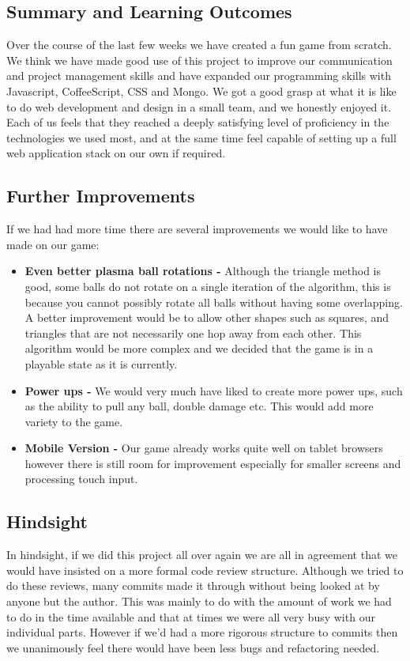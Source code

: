 \documentclass[a4wide, 11pt]{article}
\begin{document}
\subsection{Summary and Learning Outcomes}
Over the course of the last few weeks we have created a fun game from scratch.
We think we have made good use of this project to improve our communication and project management skills and have expanded our programming skills with Javascript, CoffeeScript, CSS and Mongo.
We got a good grasp at what it is like to do web development and design in a small team, and we honestly enjoyed it. Each of us feels that they reached a deeply satisfying level of proficiency in the technologies we used most, and at the same time feel capable of setting up a full web application stack on our own if required.

\subsection{Further Improvements}
If we had had more time there are several improvements we would like to have made on our game:
\begin{itemize}
    \item\textbf{Even better plasma ball rotations -} Although the triangle method is good, some balls do not rotate on a single iteration of the algorithm, this is because you cannot possibly rotate all balls without having some overlapping. A better improvement would be to allow other shapes such as squares, and triangles that are not necessarily one hop away from each other. This algorithm would be more complex and we decided that the game is in a playable state as it is currently.
    \item\textbf{Power ups -} We would very much have liked to create more power ups, such as the ability to pull any ball, double damage etc. This would add more variety to the game.
    \item\textbf{Mobile Version -} Our game already works quite well on tablet browsers however there is still room for improvement especially for smaller screens and processing touch input.
    
\end{itemize}

\subsection{Hindsight}

In hindsight, if we did this project all over again we are all in agreement that we would have insisted on a more formal code review structure. Although we tried to do these reviews, many commits made it through without being looked at by anyone but the author. This was mainly to do with the amount of work we had to do in the time available and that at times we were all very busy with our individual parts. However if we’d had a more rigorous structure to commits then we unanimously feel there would have been less bugs and refactoring needed.
\end{document}
